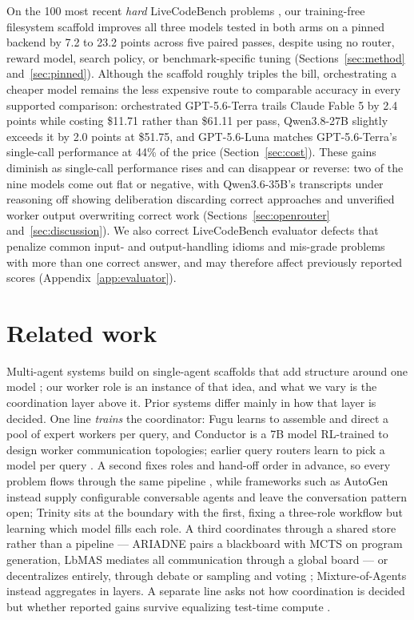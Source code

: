 \documentclass{article}
\begin{document}
On the 100 most recent \emph{hard} LiveCodeBench problems \citep{jain2024}, our training-free
filesystem scaffold improves all three models tested in both arms on a pinned backend by 7.2 to
23.2 points across five paired passes, despite using no router, reward model, search policy,
or benchmark-specific tuning
(Sections~\ref{sec:method} and~\ref{sec:pinned}). Although the scaffold roughly triples the
bill, orchestrating a cheaper model remains the less expensive route to comparable accuracy in
every supported comparison: orchestrated GPT-5.6-Terra trails Claude Fable 5 by 2.4 points
while costing \$11.71 rather than \$61.11 per pass, Qwen3.8-27B slightly exceeds it by 2.0
points at \$51.75, and
GPT-5.6-Luna matches GPT-5.6-Terra's single-call performance at 44\% of the price
(Section~\ref{sec:cost}). These gains diminish as single-call performance rises and can
disappear or reverse: two of the nine models come out flat or negative, with Qwen3.6-35B's
transcripts under reasoning off showing deliberation discarding correct approaches and
unverified worker output overwriting correct work
(Sections~\ref{sec:openrouter} and~\ref{sec:discussion}). We also correct LiveCodeBench
evaluator defects that penalize common input- and output-handling idioms and mis-grade problems
with more than one correct answer, and may therefore affect previously reported scores
(Appendix~\ref{app:evaluator}).

\section{Related work}
\label{sec:related}

Multi-agent systems build on single-agent scaffolds that add structure around one model
\citep{yao2022,shinn2023,madaan2023}; our worker role is an instance of that idea, and what
we vary is the coordination layer above it. Prior systems differ mainly in how that layer is
decided. One line \emph{trains} the coordinator: Fugu \citep{sakana2026} learns to assemble
and direct a pool of expert workers per query, and Conductor \citep{nielsen2025} is a 7B
model RL-trained to design worker communication topologies; earlier query routers learn to
pick a model per query \citep{ong2024}. A second fixes roles and hand-off order in advance,
so every problem flows through the same pipeline
\citep{hong2023,qian2023,li2023,huang2023,islam2024}, while frameworks such as AutoGen
\citep{wu2023} instead supply configurable conversable agents and leave the conversation
pattern open; Trinity \citep{xu2025} sits at the boundary with the first, fixing a
three-role workflow but learning which model fills each role. A third coordinates through a
shared store rather than a pipeline --- ARIADNE \citep{wei2026} pairs a blackboard with MCTS
on program generation, LbMAS \citep{han2025} mediates all communication through a global
board --- or decentralizes entirely, through debate \citep{du2023} or sampling and voting
\citep{li2024}; Mixture-of-Agents \citep{wangj2024a} instead aggregates in layers. A
separate line asks not how coordination is decided but whether reported gains survive
equalizing test-time compute \citep{wangj2024b,tran2026}.
\end{document}
